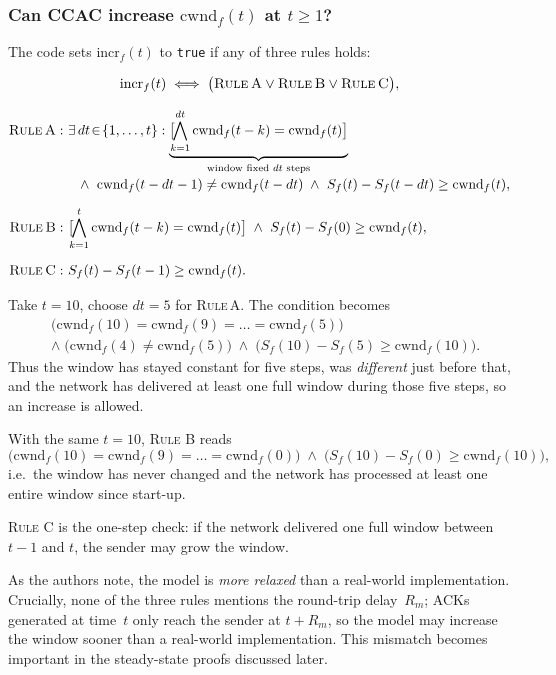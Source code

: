 \documentclass[12pt]{l4dc2023}
\begin{document}
\subsubsection{Can CCAC increase $\mathrm{cwnd}_f(t)$ at $t\ge1$?}\label{aimd}

The code sets $\mathrm{incr}_f(t)$ to \texttt{true} if any of three
rules holds:

\[
\mathrm{incr}_f(t)\;\Longleftrightarrow\;
\bigl(\textsc{Rule\,A}\lor\textsc{Rule\,B}\lor\textsc{Rule\,C}\bigr),
\]

\[
\begin{aligned}
\textsc{Rule\,A}:&\
\exists\,dt\!\in\!\{1,\dots,t\}:
\underbrace{\bigl[\!\!\bigwedge_{k=1}^{dt}
        \mathrm{cwnd}_f(t-k)=\mathrm{cwnd}_f(t)\bigr]}_{\text{window fixed $dt$ steps}}
\\[-2pt]
&\quad\land\
\mathrm{cwnd}_f(t-dt-1)\neq\mathrm{cwnd}_f(t-dt)
\;\land\
S_f(t)-S_f(t-dt)\ge\mathrm{cwnd}_f(t),
\\[6pt]
\textsc{Rule\,B}:&\
\bigl[\!\!\bigwedge_{k=1}^{t}
        \mathrm{cwnd}_f(t-k)=\mathrm{cwnd}_f(t)\bigr]
\;\land\
S_f(t)-S_f(0)\ge\mathrm{cwnd}_f(t),
\\[6pt]
\textsc{Rule\,C}:&\
S_f(t)-S_f(t-1)\ge\mathrm{cwnd}_f(t).
\end{aligned}
\]

\medskip
\noindent
Take $t=10$, choose $dt=5$ for \textsc{Rule\,A}.  
The condition becomes
\[
\begin{aligned}
&\bigl(\mathrm{cwnd}_f(10)=\mathrm{cwnd}_f(9)=\dots=\mathrm{cwnd}_f(5)\bigr)
\\[-2pt]
&\land\;
\bigl(\mathrm{cwnd}_f(4)\neq\mathrm{cwnd}_f(5)\bigr)
\;\land\;
\bigl(S_f(10)-S_f(5)\ge\mathrm{cwnd}_f(10)\bigr).
\end{aligned}
\]
Thus the window has stayed constant for five steps, was \emph{different} just before that, and the network has delivered at least one full window during those five steps, so an increase is allowed.

With the same $t=10$, \textsc{Rule B} reads
\[
\bigl(\mathrm{cwnd}_f(10)=\mathrm{cwnd}_f(9)=\dots=\mathrm{cwnd}_f(0)\bigr)
\;\land\;
\bigl(S_f(10)-S_f(0)\ge\mathrm{cwnd}_f(10)\bigr),
\]
i.e.\ the window has never changed and the network has processed at least one entire window since start-up.

\textsc{Rule C} is the one-step check: if the network delivered one full window between $t-1$ and $t$, the sender may grow the window.

\medskip
\noindent
As the authors note, the model is \emph{more relaxed} than a real-world implementation.  Crucially, none of the three rules mentions the round-trip delay~$R_m$; ACKs generated at time~$t$ only reach the sender at $t+R_m$, so the model may increase the window
sooner than a real-world implementation. This mismatch becomes important in the steady-state proofs discussed later.
\end{document}
